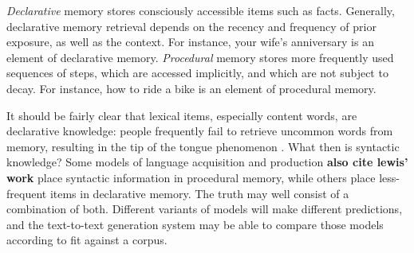 \documentclass[11pt]{article}
\begin{document}
\emph{Declarative} memory stores consciously accessible items such as facts. Generally, declarative memory retrieval depends on the recency and frequency of prior exposure, as well as the context. For instance, your wife's anniversary is an element of declarative memory. \emph{Procedural} memory stores more frequently used sequences of steps, which are accessed implicitly, and which are not subject to decay. For instance, how to ride a bike is an element of procedural memory.

It should be fairly clear that lexical items, especially content words, are declarative knowledge: people frequently fail to retrieve uncommon words from memory, resulting in the tip of the tongue phenomenon \cite{needed}. What then is syntactic knowledge?  Some models of language acquisition and production \citep[e.g.,][]{chang2006becoming}  \textbf{also cite lewis' work}   place syntactic information in procedural memory, while others \citep{reitter2011syntacticpriming} place less-frequent items in declarative memory.  The truth may well consist of a combination of both.  Different variants of models will make different predictions, and the text-to-text generation system may be able to compare those models according to fit against a corpus.


\end{document}
